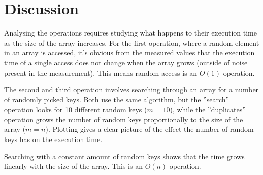 \documentclass[a4paper,11pt]{article}
\begin{document}
\section*{Discussion}

Analysing the operations requires studying what happens to their execution time as the size of the array increases.
For the first operation, where a random element in an array is accessed, it's obvious from the measured values that the execution time
of a single access does not change when the array grows (outside of noise present in the measurement). This means random access is an $O(1)$ operation.

\begin{table}[H]
\centering
{}
\end{table}

The second and third operation involves searching through an array for a number of randomly picked keys.
Both use the same algorithm, but the ''search'' operation looks for 10 different random keys ($m=10$),
while the ''duplicates'' operation grows the number of random keys proportionally to the size of the array ($m=n$).
Plotting gives a clear picture of the effect the number of random keys has on the execution time.

\begin{table}[H]
\centering
{}
\end{table}

Searching with a constant amount of random keys shows that the time grows linearly with the size of the array. This is an $O(n)$ operation.

\begin{table}[H]
\centering
{}
\end{table}
\end{document}
